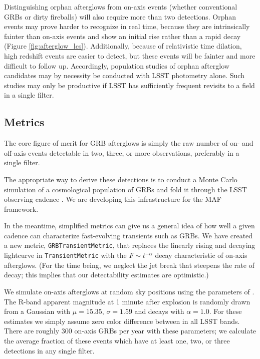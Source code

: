 Distinguishing orphan afterglows from on-axis events (whether conventional
GRBs or dirty fireballs) will also require more than two detections.
Orphan events may prove harder to recognize in real time, because they are
intrinsically fainter than on-axis events and show an initial rise rather
than a rapid decay (Figure \ref{fig:afterglow_lcs}).  Additionally, because
of relativistic time dilation, high redshift events are easier to detect,
but these events will be fainter and more difficult to follow up.
Accordingly, population studies of orphan afterglow candidates may by
necessity be conducted with LSST photometry alone.  Such studies may only
be productive if LSST has sufficiently frequent revisits to a field in a
single filter.


\subsection{Metrics}
\label{sec:\secname:metrics}

The core figure of merit for GRB afterglows is simply the raw number of
on- and off-axis events detectable in two, three, or more observations,
preferably in a single filter.

The appropriate way to derive these detections is to conduct a Monte
Carlo simulation of a cosmological population of GRBs and fold it
through the LSST observing cadence \citep[cf.][]{2011PASP..123.1034J}.
We are developing this infrastructure for the MAF framework.

In the meantime, simplified metrics can give us a general idea of how well
a given cadence can characterize fast-evolving transients such as GRBs.  We
have created a new metric, \texttt{GRBTransientMetric}, that replaces the
linearly rising and decaying lightcurve in \texttt{TransientMetric} with
the $F \sim t^{-\alpha}$ decay characteristic of on-axis afterglows.  (For
the time being, we neglect the jet break that steepens the rate of decay;
this implies that our detectability estimates are optimistic.)

We simulate on-axis afterglows at random sky positions using the parameters of
\citet{2011PASP..123.1034J}. The R-band apparent magnitude at 1 minute
after explosion is randomly drawn from a Gaussian with $\mu=15.35$,
$\sigma=1.59$ and decays with $\alpha=1.0$.  For these estimates we
simply assume zero color difference between in all LSST bands.
There are roughly 300 on-axis GRBs per year with these parameters;
we calculate the average fraction of these events which have at least one,
two, or three detections in any single filter.


